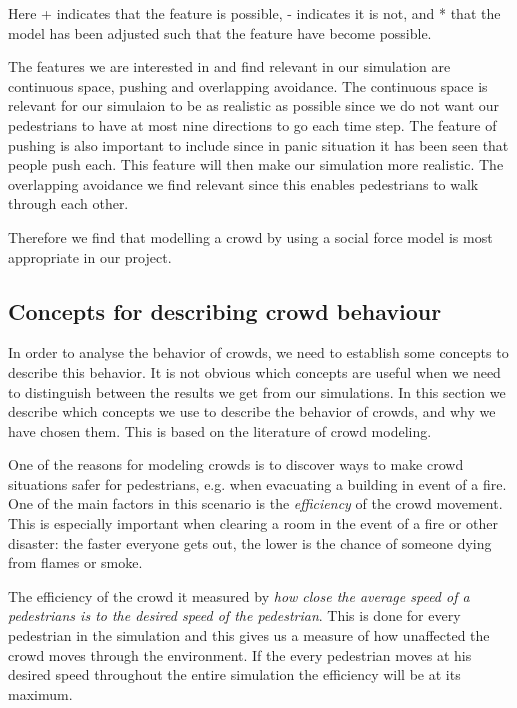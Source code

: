 Here + indicates that the feature is possible, - indicates it is not, and * that 
the model has been adjusted such that the feature have become possible. \cite{Comparison}

The features we are interested in and find relevant in our simulation are 
continuous space, pushing and overlapping avoidance. The continuous space is 
relevant for our simulaion to be as realistic as possible since we do not want 
our pedestrians to have at most nine directions to go each time step.
The feature of pushing is also important to include since in panic situation it 
has been seen that people push each. This feature will then make our simulation 
more realistic. The overlapping avoidance we find relevant since this enables 
pedestrians to walk through each other.

Therefore we find that modelling a crowd by using a social force model is most 
appropriate in our project. 


\subsection{Concepts for describing crowd behaviour}\label{concepts}
In order to analyse the behavior of crowds, we need to establish some 
concepts to describe this behavior. It is not obvious which concepts  are 
useful when we need to distinguish between the results we get from our 
simulations. In this section we describe which concepts we use to describe the 
behavior of crowds, and why we have chosen them. This is based on the 
literature of crowd modeling.


One of the reasons for modeling crowds is to discover ways to make crowd 
situations safer for pedestrians, e.g. when evacuating a building in event of 
a fire. One of the main factors in this scenario is the \emph{efficiency} of 
the crowd movement. This is especially important when clearing a room in the 
event of a fire or other disaster: the faster everyone gets out, the lower is 
the chance of someone dying from flames or smoke.

The efficiency of the crowd it measured by \emph{how close the average speed 
of a pedestrians is to the desired speed of the pedestrian}. This is done for 
every pedestrian in the simulation and this gives us a measure of how unaffected 
the crowd moves through the environment. If the every pedestrian moves at his 
desired speed throughout the entire simulation the efficiency will be at its 
maximum.

